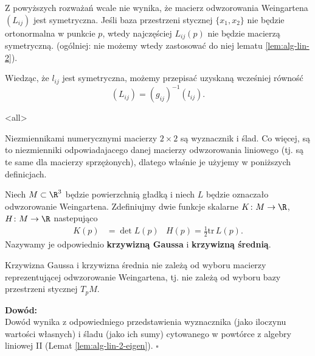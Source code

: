 \begin{frame}[<+->]

\begin{uwaga}
Z powyższych rozważań wcale nie wynika, że macierz odwzorowania Weingartena $(L_{ij})$ jest symetryczna. Jeśli baza przestrzeni stycznej $\{x_1, x_2\}$ nie będzie ortonormalna w punkcie $p$, wtedy najczęściej $L_{ij}(p)$ nie będzie macierzą symetryczną. (ogólniej: nie możemy wtedy zastosować do niej lematu \ref{lem:alg-lin-2}). 
\end{uwaga}

\begin{uwaga}
Wiedząc, że $l_{ij}$ jest symetryczna, możemy przepisać uzyskaną wcześniej równość
\[(L_{ij})=(g_{ij})^{-1}(l_{ij}).\]
\end{uwaga}

\end{frame}
\mode<all>{}
\begin{frame}

Niezmiennikami numerycznymi macierzy $2\times2$ są wyznacznik i ślad. Co więcej, są to niezmienniki odpowiadajacego danej macierzy odwzorowania liniowego (tj. są te same dla macierzy sprzężonych), dlatego właśnie je użyjemy w poniższych definicjach.

\pause \begin{definicja}
Niech $M\subset \R^3$ będzie powierzchnią gładką i niech $L$ będzie oznaczało odwzorowanie Weingartena. \pause Zdefiniujmy dwie funkcje skalarne $K\colon M\to \R$, $H\colon M\to \R$ nastepująco
\begin{align*}
K(p)&=\det L(p) & H(p)=\frac{1}{2}\text{tr}\, L(p).
\end{align*}
Nazywamy je odpowiednio \textbf{krzywizną Gaussa} i \textbf{krzywizną średnią}.
\end{definicja}

\end{frame}
\begin{frame}

\begin{lemat}
Krzywizna Gaussa i krzywizna średnia nie zależą od wyboru macierzy reprezentującej odwzorowanie Weingartena, tj. nie zależą od wyboru bazy przestrzeni stycznej $T_pM$.
\end{lemat}

\pause \textcolor{ared}{\textbf{Dowód:}}\\
Dowód wynika z odpowiedniego przedstawienia wyznacznika (jako iloczynu wartości własnych) i śladu (jako ich sumy)  cytowanego w powtórce z algebry liniowej II (Lemat \ref{lem:alg-lin-2-eigen}). \hfill $\square$

\end{frame}
